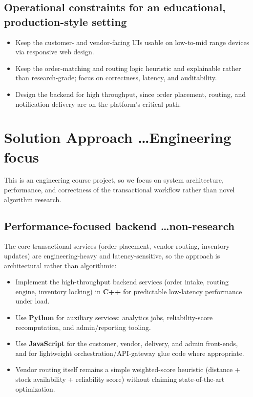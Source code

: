 \documentclass{article}
\begin{document}
\subsection{Operational constraints for an educational, production-style setting}
\begin{itemize}
    \item Keep the customer- and vendor-facing UIs usable on low-to-mid range devices via
    responsive web design.
    \item Keep the order-matching and routing logic heuristic and explainable rather than
    research-grade; focus on correctness, latency, and auditability.
    \item Design the backend for high throughput, since order placement, routing, and
    notification delivery are on the platform's critical path.
\end{itemize}

\section{Solution Approach \dots Engineering focus}
This is an engineering course project, so we focus on system architecture, performance, and
correctness of the transactional workflow rather than novel algorithm research.

\subsection{Performance-focused backend \dots non-research}
The core transactional services (order placement, vendor routing, inventory updates) are
engineering-heavy and latency-sensitive, so the approach is architectural rather than
algorithmic:
\begin{itemize}
    \item Implement the high-throughput backend services (order intake, routing engine,
    inventory locking) in \textbf{C++} for predictable low-latency performance under load.
    \item Use \textbf{Python} for auxiliary services: analytics jobs, reliability-score
    recomputation, and admin/reporting tooling.
    \item Use \textbf{JavaScript} for the customer, vendor, delivery, and admin front-ends, and
    for lightweight orchestration/API-gateway glue code where appropriate.
    \item Vendor routing itself remains a simple weighted-score heuristic (distance + stock
    availability + reliability score) without claiming state-of-the-art optimization.
\end{itemize}
\end{document}
